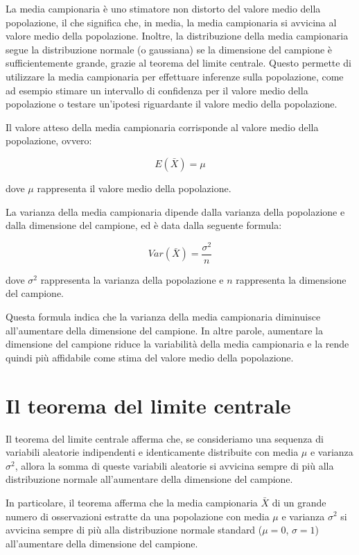 La media campionaria è uno stimatore non distorto del valore medio della popolazione, il che significa che, in media, la media campionaria si avvicina al valore medio della popolazione. Inoltre, la distribuzione della media campionaria segue la distribuzione normale (o gaussiana) se la dimensione del campione è sufficientemente grande, grazie al teorema del limite centrale. Questo permette di utilizzare la media campionaria per effettuare inferenze sulla popolazione, come ad esempio stimare un intervallo di confidenza per il valore medio della popolazione o testare un'ipotesi riguardante il valore medio della popolazione.

Il valore atteso della media campionaria corrisponde al valore medio della popolazione, ovvero:

$$E(\bar{X}) = \mu$$

dove $\mu$ rappresenta il valore medio della popolazione.

La varianza della media campionaria dipende dalla varianza della popolazione e dalla dimensione del campione, ed è data dalla seguente formula:

$$Var(\bar{X}) = \frac{\sigma^2}{n}$$

dove $\sigma^2$ rappresenta la varianza della popolazione e $n$ rappresenta la dimensione del campione.

Questa formula indica che la varianza della media campionaria diminuisce all'aumentare della dimensione del campione. In altre parole, aumentare la dimensione del campione riduce la variabilità della media campionaria e la rende quindi più affidabile come stima del valore medio della popolazione.

\section{Il teorema del limite centrale}
Il teorema del limite centrale afferma che, se consideriamo una sequenza di variabili aleatorie indipendenti e identicamente distribuite con media $\mu$ e varianza $\sigma^2$, allora la somma di queste variabili aleatorie si avvicina sempre di più alla distribuzione normale all'aumentare della dimensione del campione.

In particolare, il teorema afferma che la media campionaria $\bar{X}$ di un grande numero di osservazioni estratte da una popolazione con media $\mu$ e varianza $\sigma^2$ si avvicina sempre di più alla distribuzione normale standard ($\mu=0$, $\sigma=1$) all'aumentare della dimensione del campione.

